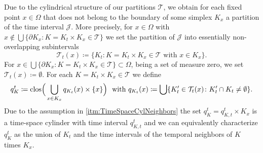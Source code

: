 \documentclass{amsart}
\providecommand{\tria}{\mathcal{T}}
\newcommand{\cJ}{\mathcal J}
\begin{document}
Due to the cylindrical structure of our partitions $\tria$, we obtain for each fixed point $x\in \Omega$ that does not belong to the boundary of some simplex $K_x$ a partition of the time interval $\mathcal{J}$. More precisely, for $x \in \Omega$ with $x \not\in\bigcup \lbrace\partial K_x\colon K = K_t\times K_x  \in \tria \rbrace$ we set the partition of $\cJ$ into essentially non-overlapping subintervals
\begin{equation*}
\tria_t(x) \coloneqq \lbrace K_t \colon K = K_t\times K_x \in \tria\text{ with }x\in K_x\rbrace.
\end{equation*}
For $x \in \bigcup \lbrace\partial K_x\colon K = K_t\times K_x  \in \tria \rbrace \subset \Omega$, being a set of measure zero, we set $\tria_t(x)\coloneqq \emptyset$.
%
For each $K = K_t \times K_x \in \tria$ we define
\begin{equation}\label{eq:def_qKt}
q_K^t \coloneqq \textup{clos}\Big( \bigcup_{x\in K_x} q_{K_t}(x) \times \lbrace x\rbrace \Big)\ \text{ with } q_{K_t}(x) \coloneqq \bigcup \lbrace K_t' \in \tria_t(x)\colon K_t'\cap K_t \neq \emptyset\rbrace.
\end{equation}
Due to the assumption in \ref{itm:TimeSpaceCylNeighbors} the set $q_K^t = q_{K,t}^t \times K_x$ is a time-space cylinder with time interval $q_{K,t}^t$ and  we can equivalently characterize $q_K^t$ as the union of $K_t$ and the time intervals of the temporal neighbors of $K$ times $K_x$. 
%
\end{document}
